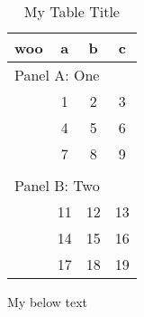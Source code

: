 \begin{table}
\centering
\begin{threeparttable}
\caption{My Table Title}
\begin{tabular}{lccc}
\toprule
woo & a & b & c\\
\midrule
\multicolumn{4}{l}{Panel A: One}\\
 & 1 & 2 & 3 \\
 & 4 & 5 & 6 \\
 & 7 & 8 & 9 \\
  &   &   &  \\
\multicolumn{4}{l}{Panel B: Two}\\
 & 11 & 12 & 13 \\
 & 14 & 15 & 16 \\
 & 17 & 18 & 19 \\
\bottomrule

\end{tabular}
\begin{tablenotes}
My below text
\end{tablenotes}
\end{threeparttable}
\end{table}